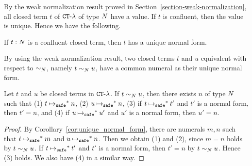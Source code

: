 By the weak normalization result proved in Section~\ref{section-weak-normalization}, all 
closed term $t$ of ${ {\tt CT} \mbox{-} \lambda}$ of type ${N}$ have a value. If $t$ is confluent, then the value is unique.
Hence we have the following. 

\begin{lemma}
  If $t:{N}$ is a confluent closed term, then $t$ has a unique normal form.
\end{lemma}

By using the weak normalization result, 
two closed terms $t$ and $u$ equivalent with respect to $\sim_{N}$, namely $t \sim_{N} u$,
have a common numeral as their unique normal form. 

\begin{lemma}
  Let $t$ and $u$ be closed terms in ${ {\tt CT} \mbox{-} \lambda}$. 
  If $t \sim_{N} u$, then there exists $n$ of type ${N}$ such that
  (1) $t \mathbin{\mathbin{\mapsto}_{\tiny \tt safe}}^* n$, (2) $u \mathbin{\mathbin{\mapsto}_{\tiny \tt safe}}^* n$,
  (3) if $t \mathbin{\mathbin{\mapsto}_{\tiny \tt safe}}^* t'$ and $t'$ is a normal form, then $t' = n$, and
  (4) if $u \mathbin{\mathbin{\mapsto}_{\tiny \tt safe}}^* u'$ and $u'$ is a normal form, then $u' = n$. 
\end{lemma}
\begin{proof}
  By Corollary~\ref{cor:unique_normal_form}, there are numerals $m,n$ such that
  $t\mathbin{\mathbin{\mapsto}_{\tiny \tt safe}}^* m$ and $u\mathbin{\mathbin{\mapsto}_{\tiny \tt safe}}^* n$.
  Then we obtain (1) and (2), since $m=n$ holds by $t\sim_{N} u$.
  If $t \mathbin{\mathbin{\mapsto}_{\tiny \tt safe}}^* t'$ and $t'$ is a normal form, then $t'=n$ by $t\sim_{N} u$.
  Hence (3) holds. We also have (4) in a similar way. 
\end{proof}




